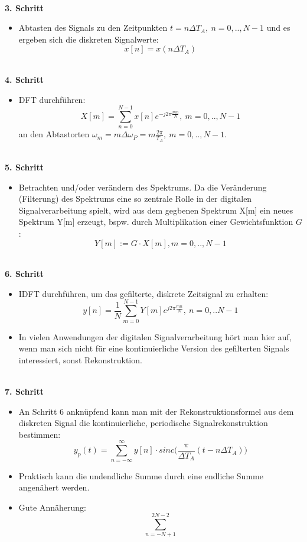 \documentclass[12pt,a4paper]{scrartcl}
\begin{document}
 \noindent \\ \textbf{3. Schritt}
 \begin{itemize}
  \item Abtasten des Signals zu den Zeitpunkten $t = n \Delta T_A,\ n = 0, .., N-1$ und es ergeben sich die diskreten Signalwerte: $$x[n] = x(n\Delta T_A)$$
 \end{itemize}

 \noindent \\ \textbf{4. Schritt}
 \begin{itemize}
  \item DFT durchführen:$$ X[m] = \sum_{n=0}^{N-1} x[n] e^{-j 2\pi \frac{mn}{N}},\ m= 0,..,N-1$$ an den Abtastorten $\omega_m = m\Delta \omega_P = m\frac{2\pi}{T_A},\ m= 0,..,N-1$.
 \end{itemize}

 \noindent \\ \textbf{5. Schritt}
 \begin{itemize}
  \item Betrachten und/oder verändern des Spektrums. Da die Veränderung (Filterung) des Spektrums eine so zentrale Rolle in der digitalen Signalverarbeitung spielt, wird aus dem gegbenen Spektrum X[m] ein neues Spektrum Y[m] erzeugt, bspw. durch Multiplikation einer Gewichtsfunktion $G$: $$Y[m] := G \cdot X[m], m = 0,..,N-1$$
 \end{itemize}

 \noindent \\ \textbf{6. Schritt}
 \begin{itemize}
  \item IDFT durchführen, um das gefilterte, diskrete Zeitsignal zu erhalten: $$ y[n] = \frac{1}{N} \sum_{m=0}^{N-1} Y[m]e^{j2\pi\frac{mn}{N}},\ n = 0,..N-1$$
  \item In vielen Anwendungen der digitalen Signalverarbeitung hört man hier auf, wenn man sich nicht für eine kontinuierliche Version des gefilterten Signals interessiert, sonst Rekonstruktion.
 \end{itemize}

 \noindent \\ \textbf{7. Schritt}
 \begin{itemize}
  \item An Schritt 6 anknüpfend kann man mit der Rekonstruktionsformel aus dem diskreten Signal die kontinuierliche, periodische Signalrekonstruktion bestimmen: $$y_p(t) = \sum_{n = -\infty}^{\infty} y[n] \cdot sinc \bigg(\frac{\pi}{\Delta T_A} ( t- n\Delta T_A)\bigg)$$
  \item Praktisch kann die undendliche Summe durch eine endliche Summe angenähert werden.
  \item Gute Annäherung: $$\sum_{n = -N+1}^{2N-2}$$
 \end{itemize}
\end{document}
